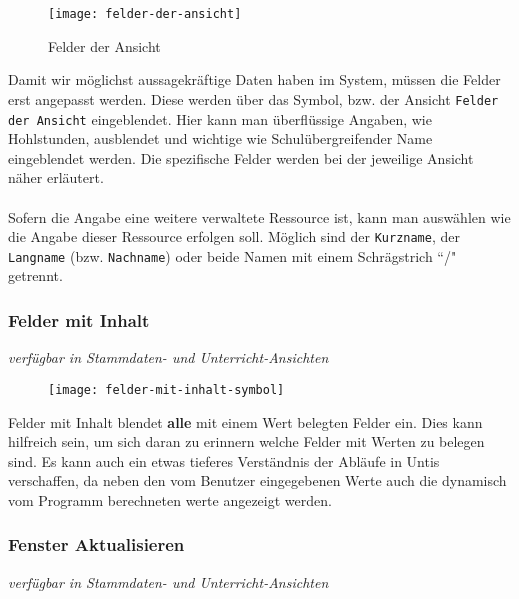 \begin{wrapfigure}{r}{0.4\textwidth}
	\texttt{[image: felder-der-ansicht]}
	\vspace{-15pt}
	\caption{Felder der Ansicht}
	\label{fig:felder-der-ansicht}
	\vspace{10pt}
\end{wrapfigure}

\noindent
Damit wir möglichst aussagekräftige Daten haben im System, müssen die Felder erst angepasst werden. Diese werden über das Symbol, bzw. der Ansicht \texttt{Felder der Ansicht} eingeblendet. Hier kann man überflüssige Angaben, wie Hohlstunden, ausblendet und wichtige wie Schulübergreifender Name eingeblendet werden. Die spezifische Felder werden bei der jeweilige Ansicht näher erläutert.\\
\\
Sofern die Angabe eine weitere verwaltete Ressource ist, kann man auswählen wie die Angabe dieser Ressource erfolgen soll. Möglich sind der \texttt{Kurzname}, der \texttt{Langname} (bzw. \texttt{Nachname}) oder beide Namen mit einem Schrägstrich ``/" getrennt.\\

\subsubsection{Felder mit Inhalt}
{\small\textit{verfügbar in Stammdaten- und Unterricht-Ansichten\\}\par}

\begin{wrapfigure}{r}{.05\textwidth}
	\vspace{-50pt}
	\texttt{[image: felder-mit-inhalt-symbol]}
	\vspace{-35pt}
\end{wrapfigure}

\noindent
Felder mit Inhalt blendet \textbf{alle} mit einem Wert belegten Felder ein. Dies kann hilfreich sein, um sich daran zu erinnern welche Felder mit Werten zu belegen sind. Es kann auch ein etwas tieferes Verständnis der Abläufe in Untis verschaffen, da neben den vom Benutzer eingegebenen Werte auch die dynamisch vom Programm berechneten werte angezeigt werden.\\

\subsubsection{Fenster Aktualisieren}
{\small\textit{verfügbar in Stammdaten- und Unterricht-Ansichten\\}\par}

